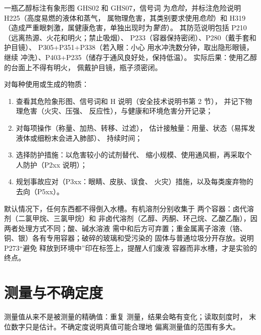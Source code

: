 \begin{example}[读懂乙醇的标签]
一瓶乙醇标注有象形图 GHS02 和 GHS07，信号词
为\emph{危险}，并标注危险说明 H225（高度易燃的液体和蒸气，
属物理危害，其类别要求使用\emph{危险}）和 H319
（造成严重眼刺激，属健康危害，单独出现时为\emph{警告}）。
其防范说明包括 P210（远离热源、火花和明火；禁止吸烟）、
P233（容器保持密闭）、P280（戴手套和护目镜）、
P305+P351+P338（若入眼：小心
用水冲洗数分钟，取出隐形眼镜，继续
冲洗）、P403+P235（储存于通风良好处，保持低温）。
实际后果：使用乙醇的台面上不得有明火，
佩戴护目镜，瓶子须密闭。
\end{example}

\begin{method}[根据安全技术说明书准备实验]\label{met:b1:lab-techniques-1:read-sds}
对每种使用或生成的物质：
\begin{enumerate}
  \item 查看其危险象形图、信号词和 H 说明（安全技术说明书第 2 节），
        并记下物理危害（火灾、压强、
        反应性），与健康和环境危害分开记录；
  \item 对每项操作（称量、加热、转移、过滤），
        估计接触量：用量、状态（易挥发液体或细粉末会进入肺部）、
        持续时间；
  \item 选择防护措施：以危害较小的试剂替代、
        缩小规模、使用通风橱，再采取个人防护（P2xx
        说明）；
  \item 规划事故应对（P3xx：眼睛、皮肤、误食、
        火灾）措施，以及每类废弃物的去向（P5xx）。
\end{enumerate}
\end{method}

\begin{inthelab}[废弃物]
默认情况下，任何东西都不得倒入水槽。有机溶剂分别收集于
两个容器：卤代溶剂（二氯甲烷、三氯甲烷）和
非卤代溶剂（乙醇、丙酮、环己烷、乙酸乙酯），因
两者处理方式不同；酸、碱水溶液
需中和后方可弃置；重金属离子溶液（铬、
铜、银）各有专用容器；破碎的玻璃和受污染的
固体与普通垃圾分开存放。说明 P273“避免
释放到环境中”印在标签上，提醒人们废液
容器而非水槽，才是实验的终点。
\end{inthelab}

\section{测量与不确定度}

测量值从来不是被测量的精确值：重复
测量，结果会略有变化；读取刻度时，
末位数字只是估计。不确定度说明真值可能合理地
偏离测量值的范围有多大。

